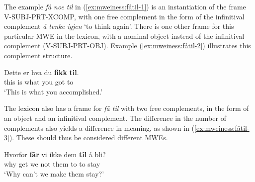 \documentclass[output=paper]{langsci/langscibook}
\begin{document}
The example \emph{få noe til} in (\ref{ex:mweiness:fåtil-1}) is an instantiation of the frame V-SUBJ-PRT-XCOMP, with one free complement in the form of the infinitival complement \emph{å tenke igjen} `to think again'.  
There is one other frame for this particular MWE in the lexicon, with a nominal object instead of the infinitival complement (V-SUBJ-PRT-OBJ). 
Example (\ref{ex:mweiness:fåtil-2}) illustrates this complement structure.

\ea\label{ex:mweiness:fåtil-2}
\gll Dette er hva du \textbf{fikk} \textbf{til}. \\ 
 this is what you got to \\
\glt `This is what you accomplished.' \\ 
\z

The lexicon also has a frame for \emph{få til} with two free complements, in the form of an object and an infinitival complement. 
The difference in the number of complements also yields a difference in meaning, as shown in (\ref{ex:mweiness:fåtil-3}). 
These should thus be considered different MWEs.

\ea\label{ex:mweiness:fåtil-3}
\gll Hvorfor \textbf{får} vi ikke dem \textbf{til} å bli? \\
 why get we not them to to stay \\
\glt `Why can't we make them stay?' \\ 
\z
\end{document}
